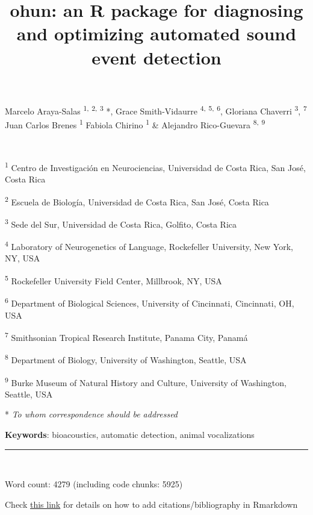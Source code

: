 \documentclass[
]{article}
\title{ohun: an R package for diagnosing and optimizing automated sound
event detection}
\author{}
\date{\vspace{-2.5em}}
\begin{document}
\maketitle

{
\setcounter{tocdepth}{3}
\tableofcontents
}
Marcelo Araya-Salas \textsuperscript{1,} \textsuperscript{2,}
\textsuperscript{3} *, Grace Smith-Vidaurre \textsuperscript{4,}
\textsuperscript{5,} \textsuperscript{6}, Gloriana Chaverri
\textsuperscript{3}, \textsuperscript{7} Juan Carlos Brenes
\textsuperscript{1} Fabiola Chirino \textsuperscript{1} \& Alejandro
Rico-Guevara \textsuperscript{8,} \textsuperscript{9}

~

\textsuperscript{1} Centro de Investigación en Neurociencias,
Universidad de Costa Rica, San José, Costa Rica

\textsuperscript{2} Escuela de Biología, Universidad de Costa Rica, San
José, Costa Rica

\textsuperscript{3} Sede del Sur, Universidad de Costa Rica, Golfito,
Costa Rica

\textsuperscript{4} Laboratory of Neurogenetics of Language, Rockefeller
University, New York, NY, USA

\textsuperscript{5} Rockefeller University Field Center, Millbrook, NY,
USA

\textsuperscript{6} Department of Biological Sciences, University of
Cincinnati, Cincinnati, OH, USA

\textsuperscript{7} Smithsonian Tropical Research Institute, Panama
City, Panamá

\textsuperscript{8} Department of Biology, University of Washington,
Seattle, USA

\textsuperscript{9} Burke Museum of Natural History and Culture,
University of Washington, Seattle, USA

* \emph{To whom correspondence should be addressed}

\textbf{Keywords}: bioacoustics, automatic detection, animal
vocalizations

\begin{center}\rule{0.5\linewidth}{0.5pt}\end{center}

~

Word count: 4279 (including code chunks: 5925)

Check
\href{https://rmarkdown.rstudio.com/authoring_bibliographies_and_citations.html}{this
link} for details on how to add citations/bibliography in Rmarkdown
\end{document}
